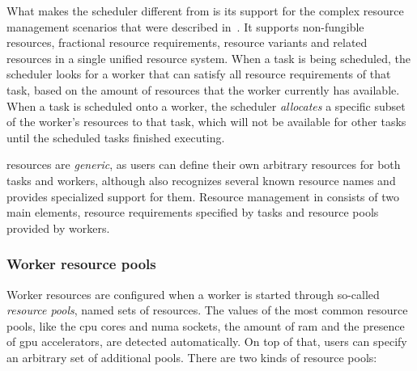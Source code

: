 What makes the scheduler different from \rsds{} is its support for the complex resource
management scenarios that were described in~.
It supports non-fungible resources, fractional resource requirements, resource variants and
related resources in a single unified resource system. When a task is
being scheduled, the scheduler looks for a worker that can satisfy all resource requirements
of that task, based on the amount of resources that the worker currently has available. When a task is scheduled onto a worker, the scheduler \emph{allocates} a specific subset of the worker's resources to that task, which will not be available for other tasks until the scheduled tasks finished executing.

\hyperqueue{} resources are \emph{generic}, as users can define their own
arbitrary resources for both tasks and workers, although \hq{} also recognizes
several known resource names and provides specialized support for them. Resource management in
\hyperqueue{} consists of two main elements, resource requirements specified by tasks and
resource pools provided by workers.

\subsubsection*{Worker resource pools}
Worker resources are configured when a worker is started through so-called \emph{resource pools},
named sets of resources. The values of the most common resource pools, like the
\gls{cpu} cores and \gls{numa} sockets, the amount of
\gls{ram} and the presence of \gls{gpu} accelerators, are detected
automatically. On top of that, users can specify an arbitrary set of additional pools. There are
two kinds of resource pools:

